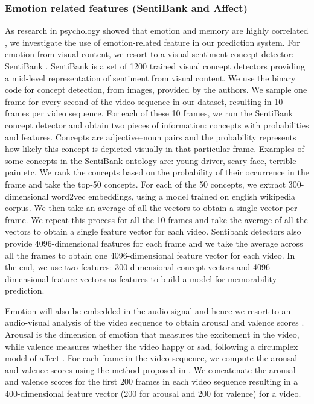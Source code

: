 \documentclass[sigconf]{acmart}
\begin{document}
\subsubsection{Emotion related features (SentiBank and Affect)}
\label{emo-feat}
As research in psychology showed that emotion and memory are highly correlated \cite{emo-mem}, we investigate the use of emotion-related feature in our prediction system.
For emotion from visual content, we resort to a visual sentiment concept detector: SentiBank \cite{sb-feat}.
SentiBank is a set of 1200 trained visual concept detectors providing a mid-level representation of sentiment from visual content.
We use the binary code for concept detection, from images, provided by the authors.
We sample one frame for every second of the video sequence in our dataset, resulting in 10 frames per video sequence.
For each of these 10 frames, we run the SentiBank concept detector and obtain two pieces of information: concepts with probabilities and features.
Concepts are adjective--noun pairs and the probability represents how likely this concept is depicted visually in that particular frame.
Examples of some concepts in the SentiBank ontology are: young driver, scary face, terrible pain etc.
We rank the concepts based on the probability of their occurrence in the frame and take the top-50 concepts.
For each of the 50 concepts, we extract 300-dimensional word2vec \cite{word2vec} embeddings, using a model trained on english wikipedia corpus.
We then take an average of all the vectors to obtain a single vector per frame.
We repeat this process for all the 10 frames and take the average of all the vectors to obtain a single feature vector for each video.
Sentibank detectors also provide 4096-dimensional features for each frame and we take the average across all the frames to obtain one 4096-dimensional feature vector for each video.
In the end, we use two features: 300-dimensional concept vectors and 4096-dimensional feature vectors as features to build a model for memorability prediction.

Emotion will also be embedded in the audio signal and hence we resort to an audio-visual analysis of the video sequence to obtain arousal and valence scores \cite{affect}.
Arousal is the dimension of emotion that measures the excitement in the video, while valence measures whether the video happy or sad, following a circumplex model of affect \cite{affect-model}.
For each frame in the video sequence, we compute the arousal and valence scores using the method proposed in \cite{affect}.
We concatenate the arousal and valence scores for the first 200 frames in each video sequence resulting in a 400-dimensional feature vector (200 for arousal and 200 for valence) for a video.
\end{document}
